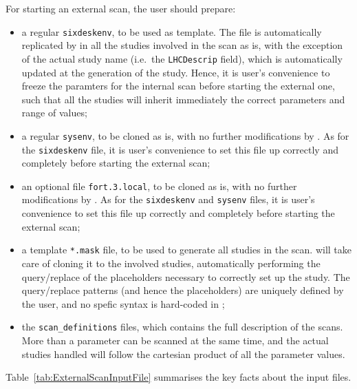 For starting an external scan, the user should prepare:
\begin{itemize}
\item a regular \texttt{sixdeskenv}, to be used as template.
  The file is automatically replicated by \SIXDESK{} in all the studies
  involved in the scan as is, with the exception of the actual study name
  (i.e.~the \texttt{LHCDescrip} field), which is automatically updated
  at the generation of the study.
  Hence, it is user's convenience to freeze the paramters for the internal
  scan before starting the external one, such that all the studies will inherit
  immediately the correct parameters and range of values;
\item a regular \texttt{sysenv}, to be cloned as is, with
  no further modifications by \SIXDESK{}. As for the \texttt{sixdeskenv} file, 
  it is user's convenience to set this file up correctly and completely
  before starting the external scan;
\item an optional file \texttt{fort.3.local}, to be cloned
  as is, with no further modifications by \SIXDESK{}. As for the
  \texttt{sixdeskenv} and \texttt{sysenv} files, it is user's convenience
  to set this file up correctly and completely before starting the external scan;
\item a template \texttt{*.mask} file, to be used to generate all studies
  in the scan. \SIXDESK{} will take care of cloning it to the involved studies,
  automatically performing the query/replace of the placeholders
  necessary to correctly set up the study. The query/replace patterns
  (and hence the placeholders) are uniquely defined by the user,
  and no spefic syntax is hard-coded in \SIXDESK{};
\item the \texttt{scan\_definitions} files, which contains
  the full description of the scans. More than a parameter can be scanned
  at the same time, and the actual studies handled will follow the cartesian
  product of all the parameter values.
\end{itemize}
Table~\ref{tab:ExternalScanInputFile} summarises the key facts about the
input files.
